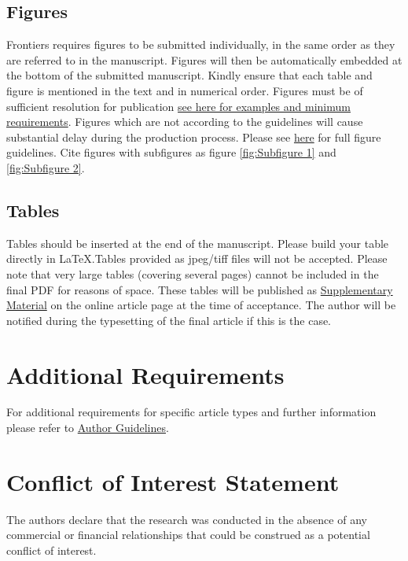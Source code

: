 \documentclass[utf8]{FrontiersinHarvard} %
\begin{document}
	
	
	\subsection{Figures}
	Frontiers requires figures to be submitted individually, in the same order as they are referred to in the manuscript. Figures will then be automatically embedded at the bottom of the submitted manuscript. Kindly ensure that each table and figure is mentioned in the text and in numerical order. Figures must be of sufficient resolution for publication \href{https://www.frontiersin.org/about/author-guidelines#ImageSizeRequirements}{see here for examples and minimum requirements}. Figures which are not according to the guidelines will cause substantial delay during the production process. Please see \href{https://www.frontiersin.org/about/author-guidelines#FigureRequirementsStyleGuidelines}{here} for full figure guidelines. Cite figures with subfigures as figure \ref{fig:Subfigure 1} and \ref{fig:Subfigure 2}.
	
	
	\subsection{Tables}
	Tables should be inserted at the end of the manuscript. Please build your table directly in LaTeX.Tables provided as jpeg/tiff files will not be accepted. Please note that very large tables (covering several pages) cannot be included in the final PDF for reasons of space. These tables will be published as \href{http://home.frontiersin.org/about/author-guidelines#SupplementaryMaterial}{Supplementary Material} on the online article page at the time of acceptance. The author will be notified during the typesetting of the final article if this is the case. 
	
	
	\section{Additional Requirements}
	
	For additional requirements for specific article types and further information please refer to \href{http://www.frontiersin.org/about/AuthorGuidelines#AdditionalRequirements}{Author Guidelines}.
	
	\section*{Conflict of Interest Statement}
	The authors declare that the research was conducted in the absence of any commercial or financial relationships that could be construed as a potential conflict of interest.
	
\end{document}
